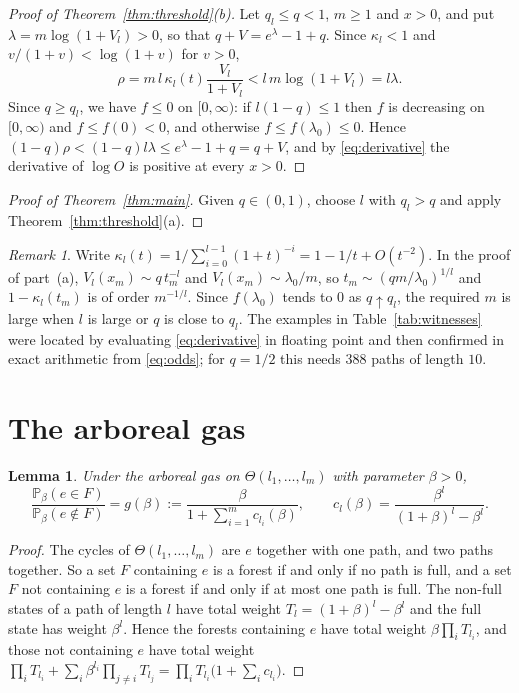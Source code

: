 \documentclass[11pt]{amsart}
\newtheorem{lemma}[theorem]{Lemma}
\theoremstyle{remark}
\newtheorem{remark}[theorem]{Remark}
\numberwithin{equation}{section}
\newcommand{\Pp}{\mathbb P}
\begin{document}
\begin{proof}[Proof of Theorem~\ref{thm:threshold}\textup{(b)}]
Let $q_l\le q<1$, $m\ge1$ and $x>0$, and put $\lambda=m\log(1+V_l)>0$, so that $q+V=e^\lambda-1+q$. Since $\kappa_l<1$ and $v/(1+v)<\log(1+v)$ for $v>0$,
\[
 \rho=m\,l\,\kappa_l(t)\frac{V_l}{1+V_l}<l\,m\log(1+V_l)=l\lambda.
\]
Since $q\ge q_l$, we have $f\le0$ on $[0,\infty)$: if $l(1-q)\le1$ then $f$ is decreasing on $[0,\infty)$ and $f\le f(0)<0$, and otherwise $f\le f(\lambda_0)\le0$. Hence $(1-q)\rho<(1-q)l\lambda\le e^\lambda-1+q=q+V$, and by \eqref{eq:derivative} the derivative of $\log O$ is positive at every $x>0$.
\end{proof}

\begin{proof}[Proof of Theorem~\ref{thm:main}]
Given $q\in(0,1)$, choose $l$ with $q_l>q$ and apply Theorem~\ref{thm:threshold}(a).
\end{proof}

\begin{remark}\label{rem:growth}
Write $\kappa_l(t)=1/\sum_{i=0}^{l-1}(1+t)^{-i}=1-1/t+O(t^{-2})$. In the proof of part~(a), $V_l(x_m)\sim q\,t_m^{-l}$ and $V_l(x_m)\sim\lambda_0/m$, so $t_m\sim(qm/\lambda_0)^{1/l}$ and $1-\kappa_l(t_m)$ is of order $m^{-1/l}$. Since $f(\lambda_0)$ tends to $0$ as $q\uparrow q_l$, the required $m$ is large when $l$ is large or $q$ is close to $q_l$. The examples in Table~\ref{tab:witnesses} were located by evaluating \eqref{eq:derivative} in floating point and then confirmed in exact arithmetic from \eqref{eq:odds}; for $q=1/2$ this needs $388$ paths of length $10$.
\end{remark}

\section{The arboreal gas}\label{sec:arboreal}

\begin{lemma}\label{lem:forest}
Under the arboreal gas on $\Theta(l_1,\dots,l_m)$ with parameter $\beta>0$,
\[
 \frac{\Pp_\beta(e\in F)}{\Pp_\beta(e\notin F)}=g(\beta):=\frac{\beta}{1+\sum_{i=1}^mc_{l_i}(\beta)},\qquad c_l(\beta)=\frac{\beta^l}{(1+\beta)^l-\beta^l}.
\]
\end{lemma}

\begin{proof}
The cycles of $\Theta(l_1,\dots,l_m)$ are $e$ together with one path, and two paths together. So a set $F$ containing $e$ is a forest if and only if no path is full, and a set $F$ not containing $e$ is a forest if and only if at most one path is full. The non-full states of a path of length $l$ have total weight $T_l=(1+\beta)^l-\beta^l$ and the full state has weight $\beta^l$. Hence the forests containing $e$ have total weight $\beta\prod_iT_{l_i}$, and those not containing $e$ have total weight $\prod_iT_{l_i}+\sum_i\beta^{l_i}\prod_{j\ne i}T_{l_j}=\prod_iT_{l_i}\bigl(1+\sum_ic_{l_i}\bigr)$.
\end{proof}
\end{document}
